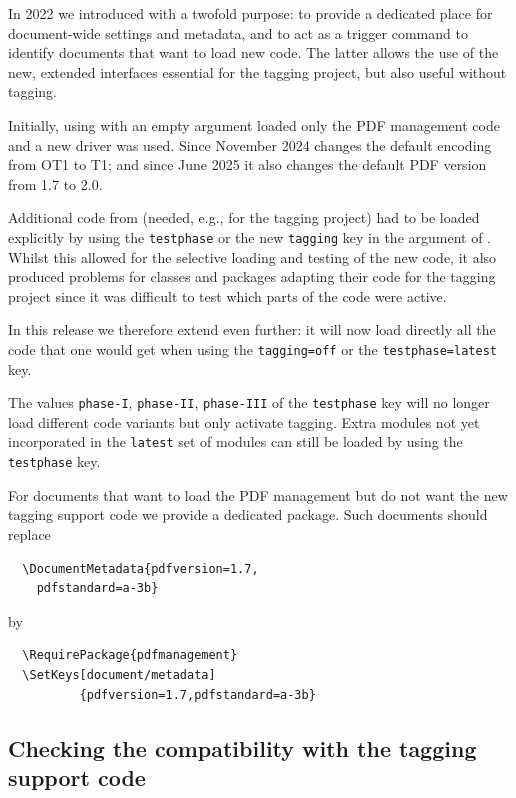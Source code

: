 \documentclass{ltnews}
\begin{document}
In 2022 we introduced  with a twofold
purpose: to provide a dedicated place for document-wide settings and
metadata, and to act as a trigger command to identify documents that
want to load new code.  The latter allows the use of the new, extended
interfaces essential for the tagging project, but also useful
without tagging.

Initially, using  with an empty argument loaded
only the PDF management code and a new  driver was used.
Since November 2024  changes the default encoding
from OT1 to T1; and since June 2025 it also changes the default PDF
version from 1.7 to 2.0.

Additional code from  (needed, e.g., for the tagging project)
had to be loaded explicitly by using the \texttt{testphase} or the new
\texttt{tagging} key in the argument of . Whilst
this allowed for the selective loading and testing of the new code, it
also produced problems for classes and packages adapting their code
for the tagging project since it was difficult to test which parts of
the  code were active.

In this release we therefore extend  even
further: it will now load directly all the code that one would get when
using the \texttt{tagging=off} or the \texttt{testphase=latest} key.

The values \texttt{phase-I}, \texttt{phase-II}, \texttt{phase-III} of
the \texttt{testphase} key will no longer load different code variants
but only activate tagging. Extra modules not yet incorporated in the
\texttt{latest} set of modules can still be loaded by using the
\texttt{testphase} key.

For documents that want to load the PDF management but do not want the
new tagging support code we provide a dedicated package. Such
documents should replace
\begin{verbatim}
  \DocumentMetadata{pdfversion=1.7,
    pdfstandard=a-3b}
\end{verbatim}
by
\begin{verbatim}
  \RequirePackage{pdfmanagement}
  \SetKeys[document/metadata]
          {pdfversion=1.7,pdfstandard=a-3b}
\end{verbatim}

\subsection{Checking the compatibility with the tagging support code}
\end{document}
